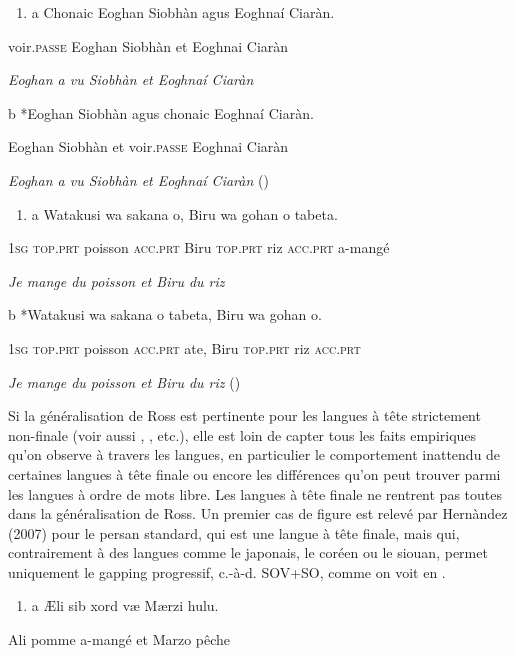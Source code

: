 \begin{enumerate}
\item \label{bkm:Ref288384400}a  Chonaic  Eoghan  Siobhàn  agus  Eoghnaí  Ciaràn.


\end{enumerate}
voir.\textsc{passe } Eoghan  Siobhàn  et  Eoghnai  Ciaràn

{\itshape
Eoghan a vu Siobhàn et Eoghnaí Ciaràn     } 

  b  *Eoghan  Siobhàn  agus  chonaic  Eoghnaí  Ciaràn.

Eoghan  Siobhàn  et  voir.\textsc{passe } Eoghnai  Ciaràn 

\textit{Eoghan a vu Siobhàn et Eoghnaí Ciaràn     } (\citet[177]{Steedman2000})


\begin{enumerate}
\item \label{bkm:Ref287347982}a  Watakusi  wa  sakana  o,  Biru  wa  gohan  o  tabeta.


\end{enumerate}
\textsc{1sg  top.prt}\textsc{  } poisson  \textsc{acc.prt } Biru  \textsc{top.prt}  riz   \textsc{acc.prt}   a-mangé

\textit{Je mange du poisson et Biru du riz         }   

  b  *Watakusi  wa  sakana  o  tabeta,  Biru  wa  gohan  o.

\textsc{1sg  top.prt}\textsc{ } poisson  \textsc{acc.prt } ate,  Biru  \textsc{top.prt}  riz   \textsc{acc.prt}

\textit{Je mange du poisson et Biru du riz         }  (\citet[251]{Ross1970})

Si la généralisation de Ross est pertinente pour les langues à tête strictement non-finale (voir aussi \citet{Jackendoff1971}, \citet{Lobeck1995}, etc.), elle est loin de capter tous les faits empiriques qu'on observe à travers les langues, en particulier le comportement inattendu de certaines langues à tête finale ou encore les différences qu'on peut trouver parmi les langues à ordre de mots libre. Les langues à tête finale ne rentrent pas toutes dans la généralisation de Ross. Un premier cas de figure est relevé par Hernàndez (2007) pour le persan standard, qui est une langue à tête finale, mais qui, contrairement à des langues comme le japonais, le coréen ou le siouan, permet uniquement le gapping progressif, c.-à-d. SOV+SO, comme on voit en .


\begin{enumerate}
\item \label{bkm:Ref287461964}a  {\AE}li    sib  xord  v{\ae}  M{\ae}rzi  hulu.


\end{enumerate}
Ali  pomme  a-mangé  et  Marzo  pêche

